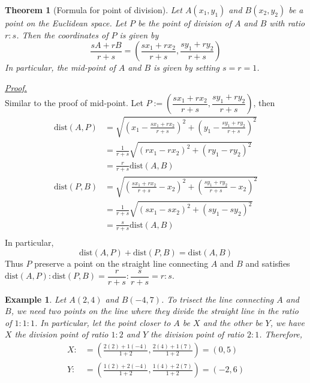 \documentclass[12pt]{article}
\newtheorem*{theorem}{Theorem}
\newtheorem*{example}{Example}
\renewenvironment{proof}[1][Proof]{\begin{snugshade*} \underline{\textit{{#1}.}}\\}{\hfill \qedsymbol \end{snugshade*}}
\begin{document}
    \begin{theorem}[Formula for point of division]
        Let $A(x_1,y_1)$ and $B(x_2,y_2)$ be a point on the Euclidean space. Let $P$ be the point of division of $A$ and $B$ with ratio $r:s$. Then the coordinates of $P$ is given by $$\frac{sA+rB}{r+s}=(\frac{sx_1+rx_2}{r+s},\frac{sy_1+ry_2}{r+s})$$ In particular, the mid-point of $A$ and $B$ is given by setting $s=r=1$.
    \end{theorem}

    \begin{proof}
        Similar to the proof of mid-point. Let $P:=(\dfrac{sx_1+rx_2}{r+s},\dfrac{sy_1+ry_2}{r+s})$, then\begin{align*}
            \mathrm{dist}(A,P)&=\sqrt{(x_1-\frac{sx_1+rx_2}{r+s})^2+(y_1-\frac{sy_1+ry_2}{r+s})^2}\\
            &=\frac{1}{r+s}\sqrt{(rx_1-rx_2)^2+(ry_1-ry_2)^2}\\
            &=\frac{r}{r+s}\mathrm{dist}(A,B)\\
            \mathrm{dist}(P,B)&=\sqrt{(\frac{sx_1+rx_2}{r+s}-x_2)^2+(\frac{sy_1+ry_2}{r+s}-x_2)^2}\\
            &=\frac{1}{r+s}\sqrt{(sx_1-sx_2)^2+(sy_1-sy_2)^2}\\
            &=\frac{s}{r+s}\mathrm{dist}(A,B)\\
        \end{align*}
        In particular, $$\mathrm{dist}(A,P)+\mathrm{dist}(P,B)=\mathrm{dist}(A,B)$$
        Thus $P$ preserve a point on the straight line connecting $A$ and $B$ and satisfies $\mathrm{dist}(A,P):\mathrm{dist}(P,B)=\dfrac{r}{r+s}:\dfrac{s}{r+s}=r:s$.
    \end{proof}

    \begin{example}
        Let $A(2,4)$ and $B(-4,7)$. To trisect the line connecting $A$ and $B$, we need two points on the line where they divide the straight line in the ratio of $1:1:1$. In particular, let the point closer to $A$ be $X$ and the other be $Y$, we have $X$ the division point of ratio $1:2$ and $Y$ the division point of ratio $2:1$. Therefore,\begin{align*}
            X:&=(\frac{2(2)+1(-4)}{1+2}, \frac{2(4)+1(7)}{1+2})=(0,5)\\
            Y:&=(\frac{1(2)+2(-4)}{1+2}, \frac{1(4)+2(7)}{1+2})=(-2,6)\\
        \end{align*}
    \end{example}
\end{document}
